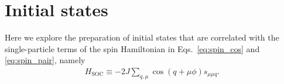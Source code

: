 \documentclass[nofootinbib,notitlepage,11pt]{revtex4-2}
\renewcommand{\t}{\text} %
\newcommand{\p}[1]{\left(#1\right)} %
\newcommand{\1}{\mathds{1}}
\begin{document}
\section{Initial states}
\label{sec:init_states}

Here we explore the preparation of initial states that are correlated with the single-particle terms of the spin Hamiltonian in Eqs.~\eqref{eq:spin_cos} and \eqref{eq:spin_pair}, namely
\begin{align}
  H_{\t{SOC}} \equiv -2 J \sum_{q,\mu} \cos\p{q+\mu\phi} s_{\mu\mu q}.
\end{align}


\end{document}
